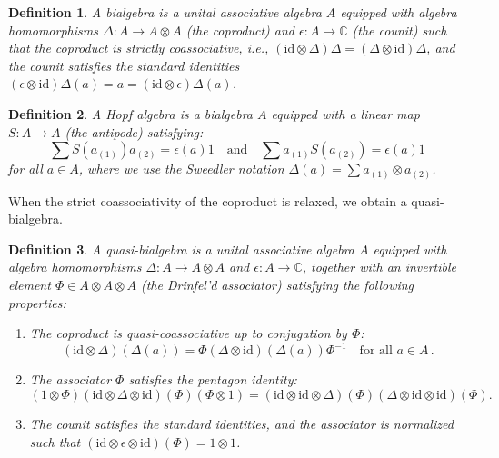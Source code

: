 \documentclass[11pt]{article}
\newcommand{\C}{\mathbb{C}}
\numberwithin{equation}{section}
\newtheorem{definition}{Definition}[section]
\begin{document}
\begin{definition}
A \emph{bialgebra} is a unital associative algebra $A$ equipped with algebra homomorphisms $\Delta: A \to A \otimes A$ (the coproduct) and $\epsilon: A \to \C$ (the counit) such that the coproduct is strictly coassociative, i.e., $(\mathrm{id} \otimes \Delta)\Delta = (\Delta \otimes \mathrm{id})\Delta$, and the counit satisfies the standard identities $(\epsilon \otimes \mathrm{id})\Delta(a) = a = (\mathrm{id} \otimes \epsilon)\Delta(a)$.
\end{definition}

\begin{definition}
A \emph{Hopf algebra} is a bialgebra $A$ equipped with a linear map $S: A \to A$ (the antipode) satisfying:
\begin{equation}
    \sum S(a_{(1)}) a_{(2)} = \epsilon(a) 1 \quad \text{and} \quad \sum a_{(1)} S(a_{(2)}) = \epsilon(a) 1
\end{equation}
for all $a \in A$, where we use the Sweedler notation $\Delta(a) = \sum a_{(1)} \otimes a_{(2)}$.
\end{definition}

When the strict coassociativity of the coproduct is relaxed, we obtain a quasi-bialgebra.

\begin{definition}
A \emph{quasi-bialgebra} is a unital associative algebra $A$ equipped with algebra homomorphisms $\Delta: A \to A \otimes A$ and $\epsilon: A \to \C$, together with an invertible element $\Phi \in A \otimes A \otimes A$ (the Drinfel'd associator) satisfying the following properties:
\begin{enumerate}
    \item The coproduct is quasi-coassociative up to conjugation by $\Phi$:
    \begin{equation}
        (\mathrm{id} \otimes \Delta)(\Delta(a)) = \Phi (\Delta \otimes \mathrm{id})(\Delta(a)) \Phi^{-1} \quad \text{for all } a \in A\,.
    \end{equation}
    \item The associator $\Phi$ satisfies the pentagon identity:
    \begin{equation}
        (1 \otimes \Phi) (\mathrm{id} \otimes \Delta \otimes \mathrm{id})(\Phi) (\Phi \otimes 1) = (\mathrm{id} \otimes \mathrm{id} \otimes \Delta)(\Phi) (\Delta \otimes \mathrm{id} \otimes \mathrm{id})(\Phi).
    \end{equation}
    \item The counit satisfies the standard identities, and the associator is normalized such that $(\mathrm{id} \otimes \epsilon \otimes \mathrm{id})(\Phi) = 1 \otimes 1$.
\end{enumerate}
\end{definition}
\end{document}
